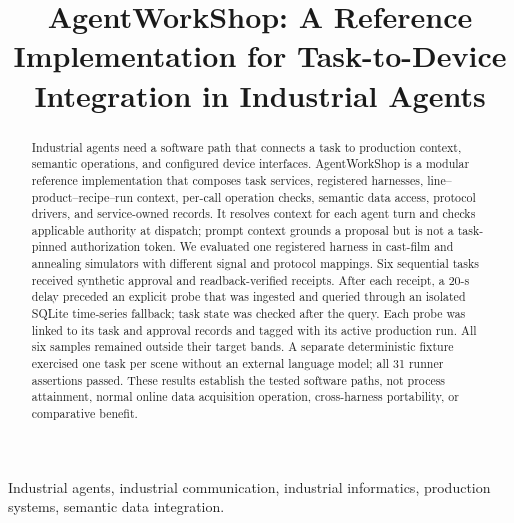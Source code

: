 \documentclass[journal]{IEEEtran}
\begin{document}

\title{AgentWorkShop: A Reference Implementation for Task-to-Device Integration in Industrial Agents}

\author{}

\maketitle

\begin{abstract}
Industrial agents need a software path that connects a task to production
context, semantic operations, and configured device interfaces. AgentWorkShop
is a modular reference implementation that composes task services, registered
harnesses, line--product--recipe--run context, per-call operation checks,
semantic data access, protocol drivers, and service-owned records. It resolves
context for each agent turn and checks applicable authority at dispatch; prompt
context grounds a proposal but is not a task-pinned authorization token. We
evaluated one registered harness in cast-film and annealing simulators with
different signal and protocol mappings. Six sequential tasks received
synthetic approval and readback-verified receipts. After each receipt, a 20-s
delay preceded an explicit probe that was ingested and queried through an
isolated SQLite time-series fallback; task state was checked after the query.
Each probe was linked to its task and approval records and tagged with its
active production run. All six samples remained outside their target bands. A
separate deterministic fixture exercised one task per scene without an
external language model; all 31 runner assertions passed. These results
establish the tested software paths, not process attainment, normal online
data acquisition operation, cross-harness portability, or comparative
benefit.
\end{abstract}

\begin{IEEEkeywords}
Industrial agents, industrial communication, industrial informatics,
production systems, semantic data integration.
\end{IEEEkeywords}

\IEEEpeerreviewmaketitle
\end{document}
